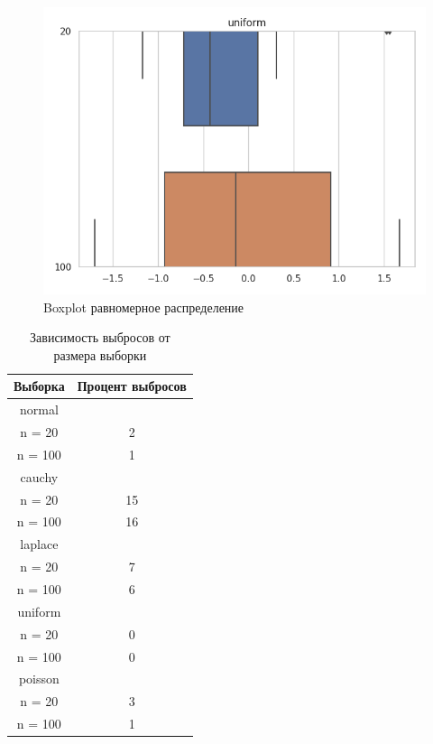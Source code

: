 \documentclass[12pt]{article}
\begin{document}
\begin{center}
\begin{figure}[H]
 \caption{Boxplot равномерное распределение }
\includegraphics[scale = 0.7]{uniform.png}
\end{figure}

\begin{table}[H]
\caption{Зависимость выбросов от размера выборки}
\label{tab:my_label2}
\begin{center}
\vspace{5mm}
\begin{tabular}{|c|c|}
\hline
Выборка & Процент выбросов\\
\hline
normal&\\
\hline
n = 20    &2    \\
\hline
n = 100   &1    \\
\hline
cauchy&\\
\hline
n = 20    &15    \\
\hline
n = 100   &16    \\
\hline
laplace&\\
\hline
n = 20    &7    \\
\hline
n = 100   &6    \\
\hline
uniform &\\
\hline
n = 20    &0   \\
\hline
n = 100   &0    \\
\hline
poisson &
\\
\hline
n = 20    &3    \\
\hline
n = 100   &1    \\
\hline

\end{tabular}
\end{center}
\end{table}
\end{center}
\end{document}
